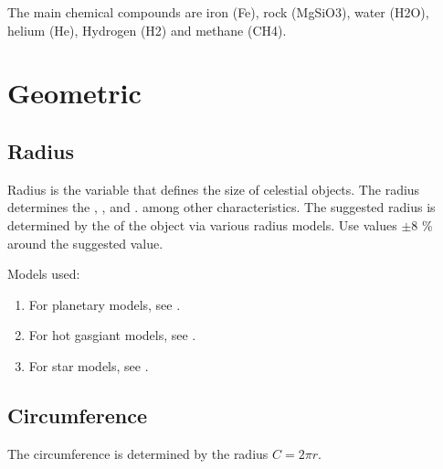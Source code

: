 \documentclass[letterpaper,10pt,english]{sphinxmanual}
\begin{document}
\sphinxAtStartPar
The main chemical compounds are iron (Fe), rock (MgSiO3), water (H2O),
helium (He), Hydrogen (H2) and methane (CH4).


\section{Geometric}
\label{\detokenize{quantities/geometric/geometric:geometric}}\label{\detokenize{quantities/geometric/geometric::doc}}

\subsection{Radius}
\label{\detokenize{quantities/geometric/radius:radius}}\label{\detokenize{quantities/geometric/radius::doc}}\label{\detokenize{quantities/geometric/radius:id1}}
\sphinxAtStartPar
Radius is the variable that defines the size of celestial objects.
The radius determines the {\hyperref[\detokenize{quantities/geometric/circumference:id1}]{}}, {\hyperref[\detokenize{quantities/geometric/surface_area:id1}]{}}, {\hyperref[\detokenize{quantities/geometric/volume:id1}]{}} and {\hyperref[\detokenize{quantities/material/density:id1}]{}}.
among other characteristics.
The suggested radius is determined by the {\hyperref[\detokenize{quantities/material/mass:id1}]{}} of the
object via various radius models. Use values \(\pm 8\) \% around
the suggested value.

\sphinxAtStartPar
Models used:
\begin{enumerate}
%
\item {} 
\sphinxAtStartPar
For planetary models, see .

\item {} 
\sphinxAtStartPar
For hot gas\sphinxhyphen{}giant models, see .

\item {} 
\sphinxAtStartPar
For star models, see .

\end{enumerate}


\subsection{Circumference}
\label{\detokenize{quantities/geometric/circumference:circumference}}\label{\detokenize{quantities/geometric/circumference::doc}}\label{\detokenize{quantities/geometric/circumference:id1}}
\sphinxAtStartPar
The circumference is determined by the radius \(C = 2 \pi r\).
\end{document}
